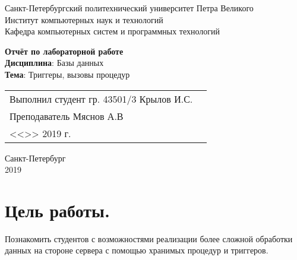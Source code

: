 \documentclass[a4paper,14pt]{extarticle}
\begin{document}
\begin{titlepage}
\centering
Санкт-Петербургский политехнический университет Петра Великого \\
Институт компьютерных наук и технологий \\
Кафедра компьютерных систем и программных технологий \\
\vspace{5.5cm}

{\centering \textbf{Отчёт по лабораторной работе} \\ 
\vspace{0.15cm}
\textbf{Дисциплина}: Базы данных \\
\vspace{0.15cm}
\textbf{Тема}: Триггеры, вызовы процедур} \\

\vspace{5.5cm}

\begin{table}[H]
\begin{tabular}{p{\textwidth}@{}r}
{Выполнил студент гр. 43501/3} \hfill 
\vspace{0.2cm}
Крылов И.С. \\ \hfill
\vspace{0.2cm}

Преподаватель \hfill 
\vspace{0.2cm}
Мяснов А.В \\ \hfill 
\vspace{0.2cm}

{} \hfill { <<\underline{\hspace{0.08\textwidth}}>> \underline{\hspace{0.2\textwidth}}2019 г.} \\
\end{tabular}
\end{table}
\vfill
{\centering Санкт-Петербург \\ 
\vspace{0.15cm}
2019}
\end{titlepage}

\section{Цель работы.}
Познакомить студентов с возможностями реализации более сложной обработки
данных на стороне сервера с помощью хранимых процедур и триггеров.
\end{document}
